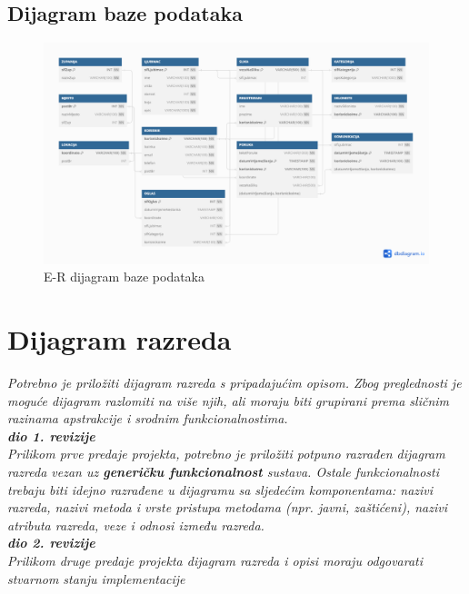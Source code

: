 			\subsection{Dijagram baze podataka}
				\begin{figure}[h]
					\centering
					\includegraphics[width=1\textwidth]{slike/ERdiagram.png}
					\caption{E-R dijagram baze podataka}
					\label{fig:mesh1}
				\end{figure}
			
			\eject
			
			
		\section{Dijagram razreda}
		
			\textit{Potrebno je priložiti dijagram razreda s pripadajućim opisom. Zbog preglednosti je moguće dijagram razlomiti na više njih, ali moraju biti grupirani prema sličnim razinama apstrakcije i srodnim funkcionalnostima.}\\
			
			\textbf{\textit{dio 1. revizije}}\\
			
			\textit{Prilikom prve predaje projekta, potrebno je priložiti potpuno razrađen dijagram razreda vezan uz \textbf{generičku funkcionalnost} sustava. Ostale funkcionalnosti trebaju biti idejno razrađene u dijagramu sa sljedećim komponentama: nazivi razreda, nazivi metoda i vrste pristupa metodama (npr. javni, zaštićeni), nazivi atributa razreda, veze i odnosi između razreda.}\\
			
			\textbf{\textit{dio 2. revizije}}\\			
			
			\textit{Prilikom druge predaje projekta dijagram razreda i opisi moraju odgovarati stvarnom stanju implementacije}
			
